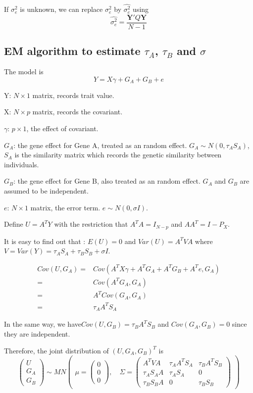 \documentclass{article}
\newcommand{\Y}{\mathbf{Y}}
\begin{document}
            If $\sigma^2_e$ is unknown, we can replace $\sigma^2_e$ by $\hat{\sigma^2_e}$ using
            \[
                \hat{\sigma^2_e}=\frac{\Y'Q\Y}{N-1}
            \]

        \subsection{EM algorithm to estimate $\tau_A$, $\tau_B$ and $\sigma$}
            The model is
            \[
                Y=X\gamma+G_A+G_B+e
            \]

            Y: $N\times1$ matrix, records trait value.

            X: $N\times p$ matrix, records the covariant.

            $\gamma$: $p\times 1$, the effect of covariant.

            $G_A$: the gene effect for Gene A, treated as an random effect. $G_A\sim N(0, \tau_AS_A)$, $S_A$ is the similarity matrix which records the genetic similarity between individuals.

            $G_B$: the gene effect for Gene B, also treated as an random effect. $G_A$ and  $G_B$ are assumed to be independent.

            $e$: $N\times1$ matrix,  the error term. $e\sim N (0, \sigma I)$.

            Define $U=A^TY$ with the restriction that $A^TA=I_{N-p}$ and $AA^T=I-P_X$.

            It is easy to find out that : $E(U)=0$ and $Var(U)=A^TVA$ where $V=Var(Y)=\tau_AS_A+\tau_BS_B+\sigma I$.

            \[ \begin{split}
                Cov(U,G_A)=& Cov(A^TX\gamma+A^TG_A+A^TG_B+A^Te,G_A)\\
                          =& Cov(A^TG_A,G_A)\\
                          =& A^TCov(G_A,G_A)\\
                          =&\tau_AA^TS_A
            \end{split}\]

            In the same way, we have$Cov(U,G_B)=\tau_BA^TS_B$ and $Cov(G_A,G_B)=0$ since they are independent.

            Therefore, the joint distribution of $(U,G_A,G_B)^T$ is
            \[
                \begin{pmatrix} U\\G_A\\G_B \end{pmatrix} \sim MN \begin{pmatrix} \mu=\begin{pmatrix} 0\\0\\0 \end{pmatrix},\quad \Sigma=\begin{pmatrix} A^TVA&\tau_AA^TS_A&\tau_BA^TS_B\\ \tau_AS_AA&\tau_AS_A&0\\\tau_BS_BA&0&\tau_BS_B \end{pmatrix} \end{pmatrix}
            \]
\end{document}
